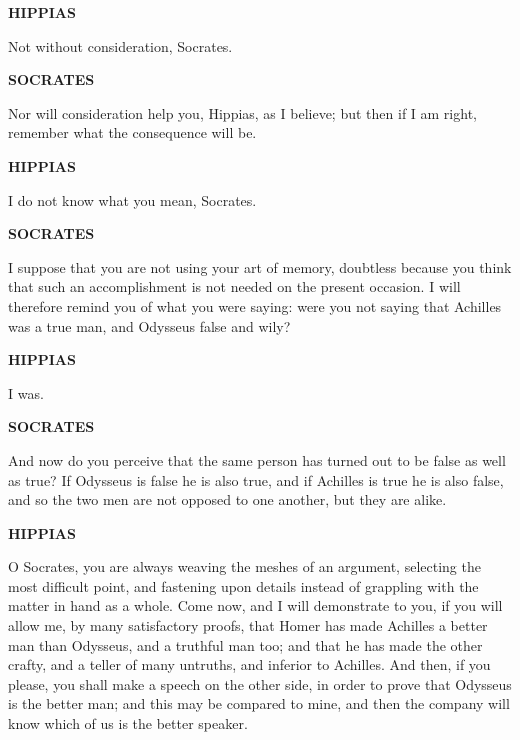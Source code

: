 \documentclass[11pt,letter]{article}
\begin{document}
\par \textbf{HIPPIAS}
\par   Not without consideration, Socrates.

\par \textbf{SOCRATES}
\par   Nor will consideration help you, Hippias, as I believe; but then if I am right, remember what the consequence will be.

\par \textbf{HIPPIAS}
\par   I do not know what you mean, Socrates.

\par \textbf{SOCRATES}
\par   I suppose that you are not using your art of memory, doubtless because you think that such an accomplishment is not needed on the present occasion. I will therefore remind you of what you were saying:  were you not saying that Achilles was a true man, and Odysseus false and wily?

\par \textbf{HIPPIAS}
\par   I was.

\par \textbf{SOCRATES}
\par   And now do you perceive that the same person has turned out to be false as well as true? If Odysseus is false he is also true, and if Achilles is true he is also false, and so the two men are not opposed to one another, but they are alike.

\par \textbf{HIPPIAS}
\par   O Socrates, you are always weaving the meshes of an argument, selecting the most difficult point, and fastening upon details instead of grappling with the matter in hand as a whole. Come now, and I will demonstrate to you, if you will allow me, by many satisfactory proofs, that Homer has made Achilles a better man than Odysseus, and a truthful man too; and that he has made the other crafty, and a teller of many untruths, and inferior to Achilles. And then, if you please, you shall make a speech on the other side, in order to prove that Odysseus is the better man; and this may be compared to mine, and then the company will know which of us is the better speaker.
\end{document}
